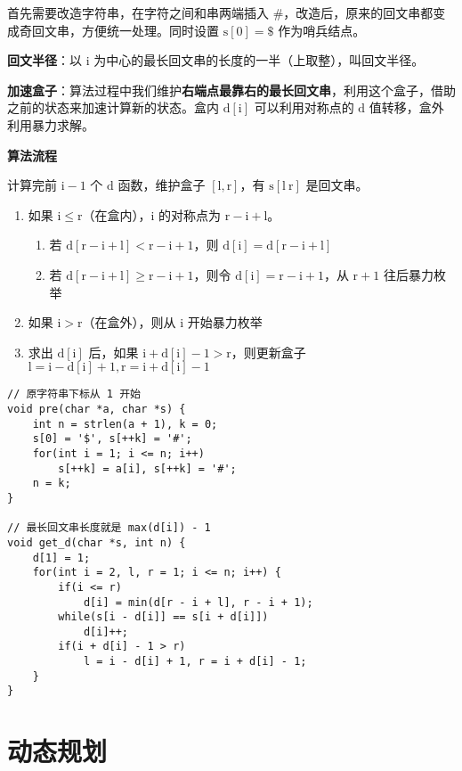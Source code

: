 \documentclass[UTF8]{article}
\begin{document}
首先需要改造字符串，在字符之间和串两端插入 \#，改造后，原来的回文串都变成奇回文串，方便统一处理。同时设置 $\mathrm{s[0] = \$}$ 作为哨兵结点。

\textbf{回文半径}：以 $\mathrm{i}$ 为中心的最长回文串的长度的一半（上取整），叫回文半径。

\textbf{加速盒子}：算法过程中我们维护\textbf{右端点最靠右的最长回文串}，利用这个盒子，借助之前的状态来加速计算新的状态。盒内 $\mathrm{d[i]}$ 可以利用对称点的 $\mathrm{d}$ 值转移，盒外利用暴力求解。

\noindent \textbf{算法流程}

计算完前 $\mathrm{i - 1}$ 个 $\mathrm{d}$ 函数，维护盒子 $\mathrm{[l, r]}$，有 $\mathrm{s[l ~ r]}$ 是回文串。

\begin{enumerate}
	\item 如果 $\mathrm{i \le r}$（在盒内），$\mathrm{i}$ 的对称点为 $\mathrm{r - i + l}$。		
	\begin{enumerate}
		\item 若 $\mathrm{d[r - i + l] < r - i + 1}$，则 $\mathrm{d[i] = d[r - i +l]}$
		\item 若 $\mathrm{d[r - i + l] \ge r - i + 1}$，则令 $\mathrm{d[i] = r - i + 1}$，从 $\mathrm{r + 1}$ 往后暴力枚举
	\end{enumerate}
	\item 如果 $\mathrm{i > r}$（在盒外），则从 $\mathrm{i}$ 开始暴力枚举
	\item 求出 $\mathrm{d[i]}$ 后，如果 $\mathrm{i + d[i] - 1 > r}$，则更新盒子 $\mathrm{l = i - d[i] + 1, r = i + d[i] - 1}$
\end{enumerate}

\begin{lstlisting}[caption=扩展 KMP]
// 原字符串下标从 1 开始
void pre(char *a, char *s) {
	int n = strlen(a + 1), k = 0;
	s[0] = '$', s[++k] = '#';
	for(int i = 1; i <= n; i++)
		s[++k] = a[i], s[++k] = '#';
	n = k;
}

// 最长回文串长度就是 max(d[i]) - 1
void get_d(char *s, int n) {
	d[1] = 1;
	for(int i = 2, l, r = 1; i <= n; i++) {
		if(i <= r)
			d[i] = min(d[r - i + l], r - i + 1);
		while(s[i - d[i]] == s[i + d[i]])
			d[i]++;
		if(i + d[i] - 1 > r)
			l = i - d[i] + 1, r = i + d[i] - 1;
	}
}
\end{lstlisting}




\newpage
\section{动态规划}
\end{document}
